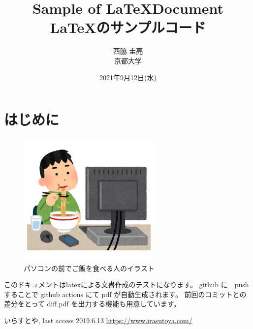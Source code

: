\documentclass[uplatex, twocolumn,10pt]{jsarticle}
\begin{document}
\title{\bf{\LARGE{Sample of \LaTeX  Document} \\ \Large{\LaTeX のサンプルコード}}}
\author{西脇 圭亮\\京都大学}
\date{2021年9月12日(水)}
\maketitle


\section{はじめに}
\begin{figure}[t]
    \begin{center}
        \includegraphics[width=7cm]{images/syokuji_computer.png}
        \caption{パソコンの前でご飯を食べる人のイラスト}
        \label{fig:syokuji_computer}
    \end{center}
\end{figure}

このドキュメントはlatexによる文書作成のテストになります。
github に　push することで github actions にて pdf が自動生成されます。
前回のコミットとの差分をとって diff.pdf を出力する機能も用意しています。

\begin{thebibliography}{99}
     いらすとや, last access 2019.6.13 \url{https://www.irasutoya.com/}



\end{thebibliography}
\end{document}
